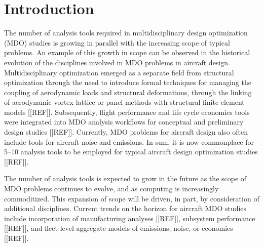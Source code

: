 \section{Introduction}
    \label{s:intro}
    The number of analysis tools required in multidisciplinary design optimization (MDO) studies is growing
    in parallel with the increasing scope of typical problems. An example of this growth in scope can
    be observed in the historical evolution of the disciplines involved in MDO problems in aircraft design.
    Multidisciplinary optimization emerged as a separate field from structural optimization through the
    need to introduce formal techniques for managing the coupling of aerodynamic loads and structural
    deformations, through the linking of aerodynamic vortex lattice or panel methods with structural finite
    element models [[REF]]. Subsequently, flight performance and life cycle economics tools were integrated
    into MDO analysis workflows for conceptual and preliminary design studies [[REF]]. Currently, MDO
    problems for aircraft design also often include tools for aircraft noise and emissions. In sum, it is now
    commonplace for 5--10 analysis tools to be employed for typical aircraft design optimization studies [[REF]].
    
    The number of analysis tools is expected to grow in the future as the scope of MDO problems continues
    to evolve, and as computing is increasingly commoditized. This expansion of scope will be driven, in
    part, by consideration of additional disciplines. Current trends on the horizon for aircraft MDO studies
    include incorporation of manufacturing analyses [[REF]], subsystem performance [[REF]], and fleet-level
    aggregate models of emissions, noise, or economics [[REF]].

